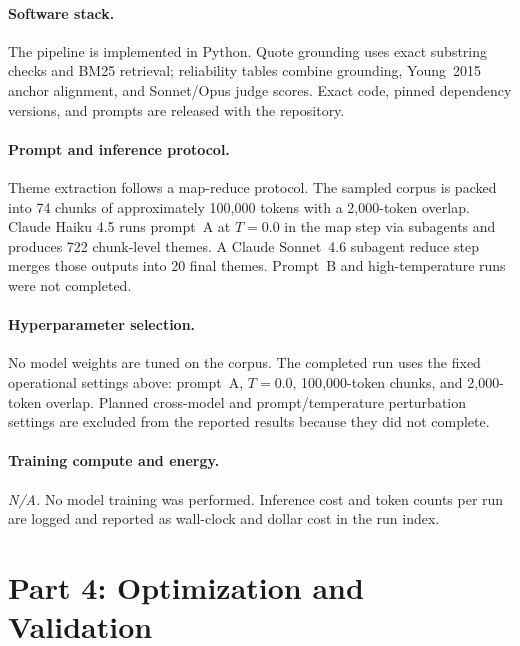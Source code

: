 \documentclass[11pt]{article}
\begin{document}
\paragraph{Software stack.}
The pipeline is implemented in Python. Quote grounding uses exact
substring checks and BM25 retrieval; reliability tables combine
grounding, Young~2015 anchor alignment, and Sonnet/Opus judge scores.
Exact code, pinned dependency versions, and prompts are released with
the repository.

\paragraph{Prompt and inference protocol.}
Theme extraction follows a map-reduce protocol. The sampled corpus is
packed into 74 chunks of approximately 100{,}000 tokens with a
2{,}000-token overlap. Claude Haiku 4.5 runs prompt~A at $T=0.0$ in the
map step via subagents and produces 722 chunk-level themes. A Claude
Sonnet~4.6 subagent reduce step merges those outputs into 20 final
themes. Prompt~B and high-temperature runs were not completed.

\paragraph{Hyperparameter selection.}
No model weights are tuned on the corpus. The completed run uses the
fixed operational settings above: prompt~A, $T=0.0$, 100{,}000-token
chunks, and 2{,}000-token overlap. Planned cross-model and
prompt/temperature perturbation settings are excluded from the reported
results because they did not complete.

\paragraph{Training compute and energy.}
\emph{N/A.} No model training was performed. Inference cost and token
counts per run are logged and reported as wall-clock and dollar cost in
the run index.

\section*{Part 4: Optimization and Validation}
\end{document}
